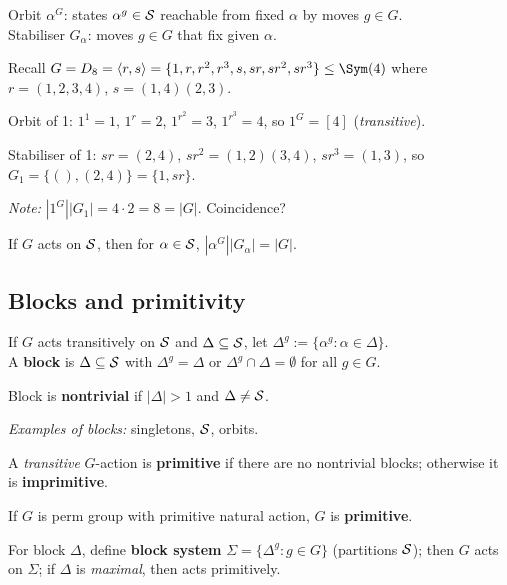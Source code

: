 \begin{slide}
    Orbit $\alpha^G$: states $\alpha^g \in \mathcal{S}$ reachable from fixed $\alpha$ by moves $g \in G$. \\
    Stabiliser $G_\alpha$: moves $g \in G$ that fix given $\alpha$.

    \begin{example}
        \vspace{0pt}
        Recall $G = D_8 = \langle r,s \rangle = \{1,r,r^2,r^3,s,sr,sr^2,sr^3\} \leq \Sym(4)$ where $r = (1,2,3,4)$, $s = (1,4)(2,3)$.

        Orbit of 1: $1^1 = 1$, $1^r = 2$, $1^{r^2} = 3$, $1^{r^3} = 4$, so $1^G = [4]$ (\textit{transitive}). \pause

        Stabiliser of 1: $sr = (2,4)$, $sr^2 = (1,2)(3,4)$, $sr^3 = (1,3)$, so $G_1 = \{(),(2,4)\} = \{1,sr\}$. \pause

        \textit{Note:} $|1^G||G_1| = 4 \cdot 2 = 8 = |G|$. Coincidence?
    \end{example} \pause

    \begin{theorem}
        \vspace{0pt}
        If $G$ acts on $\mathcal{S}$, then for $\alpha \in \mathcal{S}$, $|\alpha^G||G_\alpha| = |G|$.
    \end{theorem}
\end{slide}

\subsection{Blocks and primitivity}

\begin{slide}
    \begin{definition}[block]
        \vspace{0pt}
        If $G$ acts transitively on $\mathcal{S}$ and $\Delta \subseteq \mathcal{S}$, let $\Delta^g := \{\alpha^g : \alpha \in \Delta\}$. \\
        A \textbf{block} is $\Delta \subseteq \mathcal{S}$ with $\Delta^g = \Delta$ or $\Delta^g \cap \Delta = \emptyset$ for all $g \in G$. \pause

        Block is \textbf{nontrivial} if $|\Delta| > 1$ and $\Delta \neq \mathcal{S}$.
    \end{definition}

    \textit{Examples of blocks:} singletons, $\mathcal{S}$, orbits. \pause

    \begin{definition}[primitivity]
        \vspace{0pt}
        A \textit{transitive} $G$-action is \textbf{primitive} if there are no nontrivial blocks; otherwise it is \textbf{imprimitive}.

        If $G$ is perm group with primitive natural action, $G$ is \textbf{primitive}.
    \end{definition} \pause

    For block $\Delta$, define \textbf{block system} $\Sigma = \{\Delta^g : g \in G\}$ (partitions $\mathcal{S}$); then $G$ acts on $\Sigma$; if $\Delta$ is \textit{maximal}, then acts primitively.
\end{slide}

